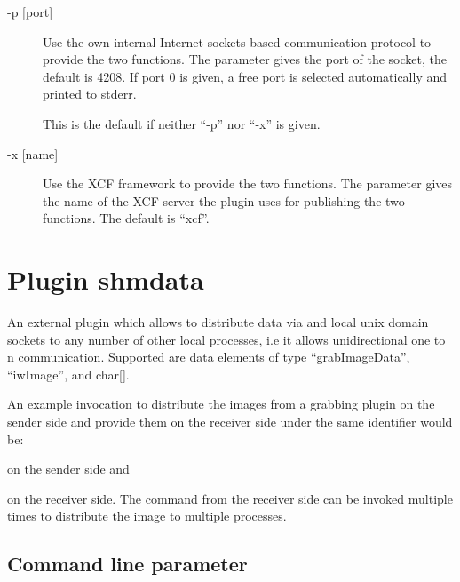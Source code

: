 \begin{description}
\item[-p [port{]}]
  Use the own internal Internet sockets based communication protocol
  to provide the two functions. The parameter gives the port of the
  socket, the default is 4208. If port 0 is given, a free port is
  selected automatically and printed to stderr.

  This is the default if neither ``-p'' nor ``-x'' is given.
\item[-x [name{]}]
  Use the XCF framework to provide the two functions. The parameter
  gives the name of the XCF server the plugin uses for publishing
  the two functions. The default is ``xcf''.
\end{description}

\section{Plugin shmdata}

An external plugin which allows to distribute data via  and local unix domain sockets to any number of other local
processes, i.e it allows unidirectional one to n
communication. Supported are data elements of type
``grabImageData'', ``iwImage'', and char[].

An example invocation to distribute the images from a grabbing
plugin on the sender side and provide them on the receiver side
under the same identifier would be:\\
\begin{small}
\end{small}
on the sender side and\\
\begin{small}
\end{small}
on the receiver side. The command from the receiver side can be
invoked multiple times to distribute the image to multiple
\icewing{} processes.

\subsection{Command line parameter}

